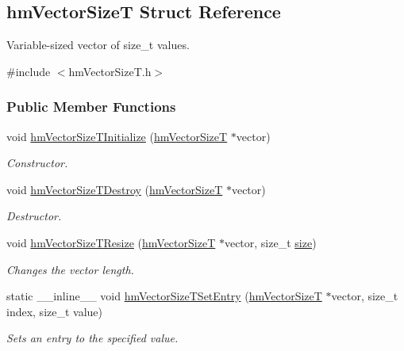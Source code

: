 \hypertarget{structhm_vector_size_t}{\subsection{hm\-Vector\-Size\-T Struct Reference}
\label{structhm_vector_size_t}
}


Variable-\/sized vector of size\-\_\-t values.  




{\ttfamily \#include $<$hm\-Vector\-Size\-T.\-h$>$}

\subsubsection*{Public Member Functions}
\begin{DoxyCompactItemize}
\item 
void \hyperlink{structhm_vector_size_t_ac8aa99bbff6fa3edfba85628f892a278}{hm\-Vector\-Size\-T\-Initialize} (\hyperlink{structhm_vector_size_t}{hm\-Vector\-Size\-T} $\ast$vector)
\begin{DoxyCompactList}\small\item\em Constructor. \end{DoxyCompactList}\item 
void \hyperlink{structhm_vector_size_t_acbd454b4a04c5d4e539f0fadea2998c0}{hm\-Vector\-Size\-T\-Destroy} (\hyperlink{structhm_vector_size_t}{hm\-Vector\-Size\-T} $\ast$vector)
\begin{DoxyCompactList}\small\item\em Destructor. \end{DoxyCompactList}\item 
void \hyperlink{structhm_vector_size_t_ae6175d79345791c2d7a07dee5bb04e8d}{hm\-Vector\-Size\-T\-Resize} (\hyperlink{structhm_vector_size_t}{hm\-Vector\-Size\-T} $\ast$vector, size\-\_\-t \hyperlink{structhm_vector_size_t_a854352f53b148adc24983a58a1866d66}{size})
\begin{DoxyCompactList}\small\item\em Changes the vector length. \end{DoxyCompactList}\item 
static \-\_\-\-\_\-inline\-\_\-\-\_\- void \hyperlink{structhm_vector_size_t_af3a372c8a7ecdb995a7238bd72457d3a}{hm\-Vector\-Size\-T\-Set\-Entry} (\hyperlink{structhm_vector_size_t}{hm\-Vector\-Size\-T} $\ast$vector, size\-\_\-t index, size\-\_\-t value)
\begin{DoxyCompactList}\small\item\em Sets an entry to the specified value. \end{DoxyCompactList}\item 

\end{DoxyCompactItemize}
